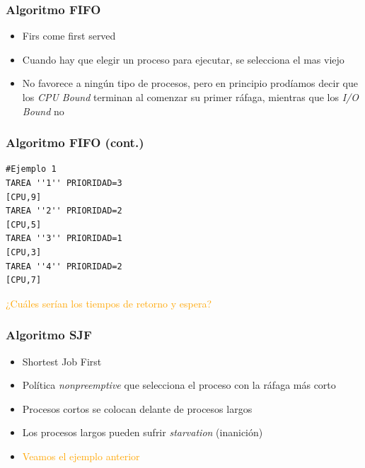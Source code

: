 \begin{frame}
  \frametitle{Algoritmo \textbf{FIFO}}
  \begin{itemize}
		\item Firs come first served
		\item Cuando hay que elegir un proceso para ejecutar, se selecciona el mas viejo
		\item No favorece a ningún tipo de procesos, pero en principio prodíamos decir que los \textit{CPU Bound} terminan al comenzar su primer ráfaga, mientras que los \textit{I/O Bound} no
  \end{itemize}
\end{frame}

\begin{frame}[fragile]
  \frametitle{Algoritmo \textbf{FIFO} (cont.)}
  \begin{table}
      \centering
  \end{table}  
  \begin{lstlisting}
#Ejemplo 1
TAREA ''1'' PRIORIDAD=3
[CPU,9]
TAREA ''2'' PRIORIDAD=2
[CPU,5]
TAREA ''3'' PRIORIDAD=1
[CPU,3]
TAREA ''4'' PRIORIDAD=2
[CPU,7]  
  \end{lstlisting}  
  \hspace{35pt} \textcolor{orange}{¿Cuáles serían los tiempos de retorno y espera?}
\end{frame}

\begin{frame}
  \frametitle{Algoritmo \textbf{SJF}}
  \begin{itemize}
  		\item Shortest Job First
		\item Política \textit{nonpreemptive} que selecciona el proceso con la ráfaga más corto
		\item Procesos cortos se colocan delante de procesos largos
		\item Los procesos largos pueden sufrir \textit{starvation} (inanición)
  		\pause
  		\item \textcolor{orange}{Veamos el ejemplo anterior}	
  \end{itemize}
\end{frame}

